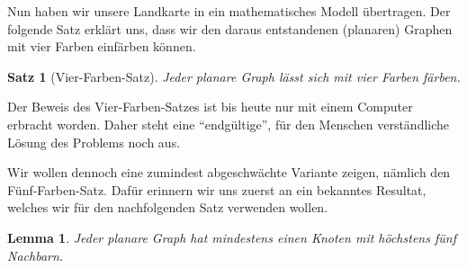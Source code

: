 \documentclass[ngerman, a4paper, 12pt]{article}
\newcounter{themcount}
\theoremstyle{plain}
\newtheorem{satz}[themcount]{Satz}
\newtheorem{lemma}[themcount]{Lemma}
\theoremstyle{break}
\theoremstyle{proofstyle}
\begin{document}
	Nun haben wir unsere Landkarte in ein mathematisches Modell übertragen.  Der folgende Satz erklärt uns, dass wir den daraus entstandenen (planaren) Graphen mit vier Farben einfärben können.

	\begin{satz}[Vier-Farben-Satz]
		Jeder planare Graph lässt sich mit vier Farben färben.
	\end{satz}

	Der Beweis des Vier-Farben-Satzes ist bis heute nur mit einem Computer erbracht worden. Daher steht eine \enquote{endgültige}, für den Menschen verständliche Lösung des Problems noch aus.
	
	Wir wollen dennoch eine zumindest abgeschwächte Variante zeigen, nämlich den Fünf-Farben-Satz. Dafür erinnern wir uns zuerst an ein bekanntes Resultat, welches wir für den nachfolgenden Satz verwenden wollen.
	
	\begin{lemma}
		\label{lemma: planar5Knoten}
		Jeder planare Graph hat mindestens einen Knoten mit höchstens fünf Nachbarn.
	\end{lemma}
\end{document}
